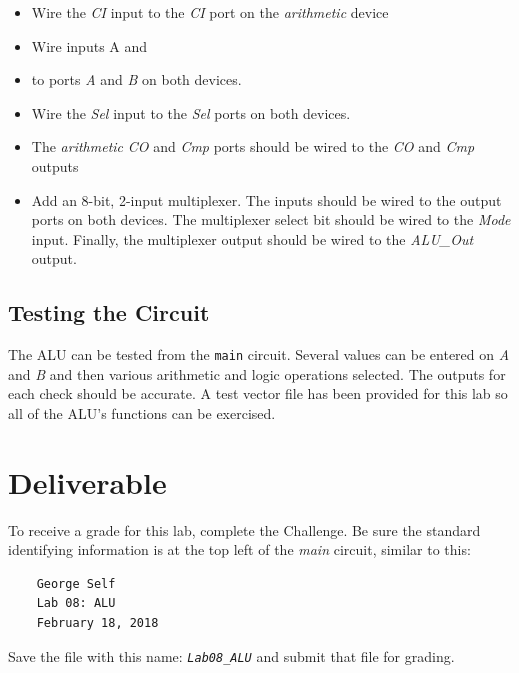 \begin{itemize}
	\item Wire the \textit{CI} input to the \textit{CI} port on the \textit{arithmetic} device
	\item Wire inputs A and \item  to ports \textit{A} and \textit{B} on both devices.
	\item Wire the \textit{Sel} input to the \textit{Sel} ports on both devices.
	\item The \textit{arithmetic} \textit{CO} and \textit{Cmp} ports should be wired to the \textit{CO} and \textit{Cmp} outputs
	\item Add an 8-bit, 2-input multiplexer. The inputs should be wired to the output ports on both devices. The multiplexer select bit should be wired to the \textit{Mode} input. Finally, the multiplexer output should be wired to the \textit{ALU\_Out} output.
\end{itemize}


\subsection{Testing the Circuit}

The \ac{ALU} can be tested from the \lstinline[columns=fixed]|main| circuit. Several values can be entered on \textit{A} and \textit{B} and then various arithmetic and logic operations selected. The outputs for each check should be accurate. A test vector file has been provided for this lab so all of the ALU's functions can be exercised.

\section{Deliverable}

To receive a grade for this lab, complete the Challenge. Be sure the standard identifying information is at the top left of the \textit{main} circuit, similar to this: 

\bigskip
\begin{minipage}{\linewidth}
	\begin{verbatim}
	George Self
	Lab 08: ALU
	February 18, 2018
	\end{verbatim}
\end{minipage}
\bigskip

Save the file with this name: \emph{\texttt{Lab08\_ALU}} and submit that file for grading.
